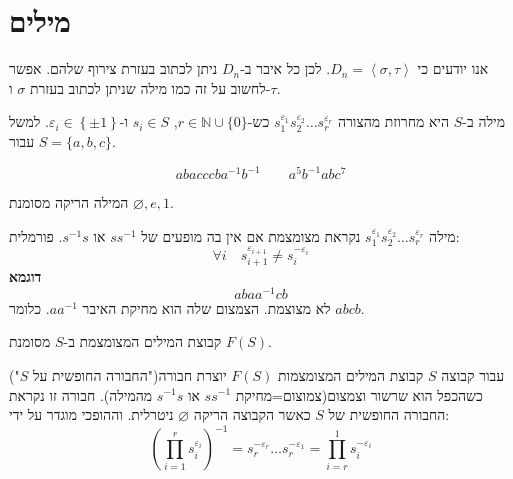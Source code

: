 \documentclass{tstextbook}
\begin{document}

\section{מילים}

אנו יודעים כי \(D_{n}=\left\langle  \sigma,\tau \right\rangle\). לכן כל איבר ב-\(D_{n}\) ניתן לכתוב בעזרת צירוף שלהם. אפשר לחשוב על זה כמו מילה שניתן לכתוב בעזרת \(\sigma\) ו-\(\tau\).

\begin{definition}
מילה ב-\(S\) היא מחרוזת מהצורה \(s_{1}^{\varepsilon_{1}} s_{2}^{\varepsilon_{2}} \dots s_{r}^{\varepsilon_{r}}\) כש-\(r\in \mathbb{N} \cup \{ 0 \}\), \(s_{i}\in S\) ו-\(\varepsilon_{i}\in \left\{  \pm 1  \right\}\). למשל עבור \(S=\{ a,b,c \}\).

\end{definition}
\begin{example}
$$abacccba^{-1} b^{-1} \qquad a^5b^{-1} abc^7$$

\end{example}
\begin{symbolize}
המילה הריקה מסומנת \(\varnothing,e,1\).

\end{symbolize}
\begin{definition}
מילה \(s_{1}^{\varepsilon_{1}} s_{2}^{\varepsilon_{2}} \dots s_{r}^{\varepsilon_{r}}\) נקראת מצומצמת אם אין בה מופעים של \(ss ^{-1}\) או \(s ^{-1} s\). פורמלית:
$$\forall i\quad s_{i+1}^{\varepsilon_{i+1}}\neq s_{i}^{-\varepsilon_{i}}$$\textbf{דוגמא}$$abaa ^{-1} cb$$
לא מצוצמת. הצמצום שלה הוא מחיקת האיבר \(aa^{-1}\). כלומר \(abcb\).

\end{definition}
\begin{definition}
קבוצת המילים המצומצמת ב-\(S\) מסומנת \(F(S)\). 

\end{definition}
\begin{proposition}
עבור קבוצה \(S\) קבוצת המילים המצומצמות \(F(S)\) יוצרת חבורה("החבורה החופשית על \(S\)") כשהכפל הוא שרשור וצמצום(צמוצום=מחיקת \(ss^{-1}\) או \(s ^{-1} s\) מהמילה). חבורה זו נקראת החבורה החופשית של \(S\) כאשר הקבוצה הריקה \(\varnothing\) ניטרלית. וההופכי מוגדר על ידי:
$$\left( \prod_{i=1}^r s_{i}^{\varepsilon_{i}} \right)^{-1} = s_{r}^{-\varepsilon_{r}}\dots s_{r}^{-\varepsilon _{1}}=\prod_{i=r}^1 s_{i}^{-\varepsilon_{i}}$$

\end{proposition}
\end{document}
